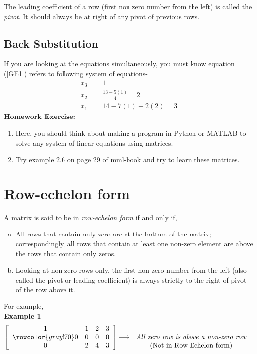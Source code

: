 \documentclass{article}
\begin{document}
The leading coefficient of a row (first non zero number from the left) is called the \textit{pivot}. It should always be at right of any pivot of previous rows.\\
\subsection{Back Substitution}
If you are looking at the equations simultaneously, you must know equation (\ref{GE1}) refers to following system of equations-  \\

\begin{equation} \tag{Back Substitution}
\begin{split}
x_3 &= 1\\
x_2 &= \frac{13 - 5(1)}{4} = 2 \\
x_1 &= 14 - 7(1) - 2(2) = 3
\end{split}
\end{equation}
\textbf{Homework Exercise:}
\begin{enumerate}
    \item Here, you should think about making a program in Python or MATLAB to solve any system of linear equations using matrices.
    \item Try example 2.6 on page 29 of mml-book and try to learn these matrices.
\end{enumerate}


\section{Row-echelon form}
A matrix is said to be in \textit{row-echelon form} if and only if,
\begin{enumerate} [a.]
    \item All rows that contain only zero are at the bottom of the matrix; correspondingly, all rows that contain at least one non-zero element are above the rows that contain only zeros.
    \item Looking at non-zero rows only, the first non-zero number from the left (also called the pivot or leading coefficient) is always strictly to the right of pivot of the row above it.
\end{enumerate}
For example,\\

\textbf{Example 1} 
 \[
 \left[\begin{array}{cccc}
     1 &1 &2 &3\\ 
     \rowcolor{gray!70}
     0 &0 &0 &0\\
     0 &2 &4 &3
  \end{array}\right]
  \begin{matrix}
    & &\\
     \longrightarrow &\emph{All zero row is above a non-zero row}\\
    & \text{(Not in Row-Echelon form)} \nonumber
  \end{matrix}
\]
\end{document}
